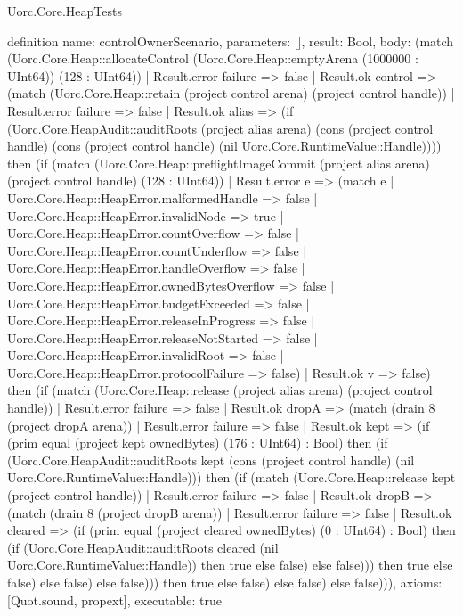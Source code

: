 \begin{lexlean}{Uorc.Core.HeapTests}
\begin{semanticmodule}
definition{
  name: controlOwnerScenario,
  parameters: [],
  result: Bool,
  body: (match (Uorc.Core.Heap::allocateControl (Uorc.Core.Heap::emptyArena (1000000 : UInt64)) (128 : UInt64))
    | Result.error failure => false
    | Result.ok control => (match (Uorc.Core.Heap::retain (project control arena) (project control handle))
      | Result.error failure => false
      | Result.ok alias => (if (Uorc.Core.HeapAudit::auditRoots (project alias arena) (cons (project control handle) (cons (project control handle) (nil Uorc.Core.RuntimeValue::Handle)))) then (if (match (Uorc.Core.Heap::preflightImageCommit (project alias arena) (project control handle) (128 : UInt64))
        | Result.error e => (match e
          | Uorc.Core.Heap::HeapError.malformedHandle => false
          | Uorc.Core.Heap::HeapError.invalidNode => true
          | Uorc.Core.Heap::HeapError.countOverflow => false
          | Uorc.Core.Heap::HeapError.countUnderflow => false
          | Uorc.Core.Heap::HeapError.handleOverflow => false
          | Uorc.Core.Heap::HeapError.ownedBytesOverflow => false
          | Uorc.Core.Heap::HeapError.budgetExceeded => false
          | Uorc.Core.Heap::HeapError.releaseInProgress => false
          | Uorc.Core.Heap::HeapError.releaseNotStarted => false
          | Uorc.Core.Heap::HeapError.invalidRoot => false
          | Uorc.Core.Heap::HeapError.protocolFailure => false)
        | Result.ok v => false) then (if (match (Uorc.Core.Heap::release (project alias arena) (project control handle))
        | Result.error failure => false
        | Result.ok dropA => (match (drain 8 (project dropA arena))
          | Result.error failure => false
          | Result.ok kept => (if (prim equal (project kept ownedBytes) (176 : UInt64) : Bool) then (if (Uorc.Core.HeapAudit::auditRoots kept (cons (project control handle) (nil Uorc.Core.RuntimeValue::Handle))) then (if (match (Uorc.Core.Heap::release kept (project control handle))
            | Result.error failure => false
            | Result.ok dropB => (match (drain 8 (project dropB arena))
              | Result.error failure => false
              | Result.ok cleared => (if (prim equal (project cleared ownedBytes) (0 : UInt64) : Bool) then (if (Uorc.Core.HeapAudit::auditRoots cleared (nil Uorc.Core.RuntimeValue::Handle)) then true else false) else false))) then true else false) else false) else false))) then true else false) else false) else false))),
  axioms: [Quot.sound, propext],
  executable: true
}


\end{semanticmodule}
\end{lexlean}
